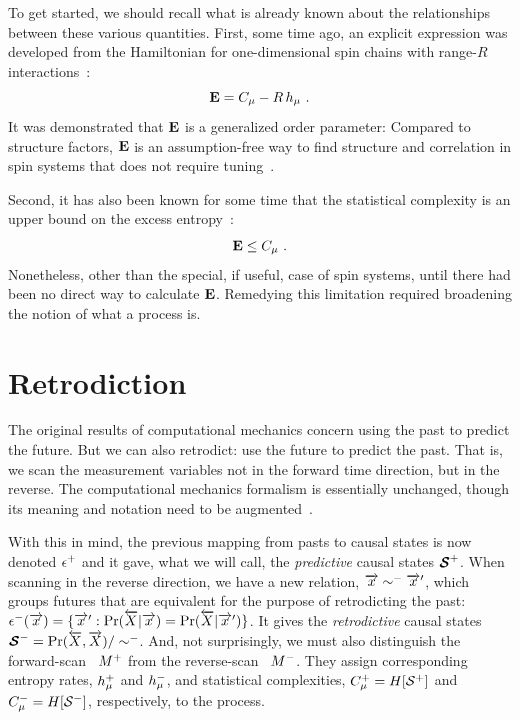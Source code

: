 To get started, we should recall what is already known about the relationships
between these various quantities.
First, some time ago, an explicit expression was developed from the Hamiltonian
for one-dimensional spin chains with range-$R$ interactions~\cite{Crut97a}:
\begin{equation}
{\bf E} = C_\mu - R \, h_\mu ~.
\label{SpinEEandCmu}
\end{equation}
It was demonstrated that ${\bf E}$ is a generalized order parameter: Compared to
structure factors, ${\bf E}$ is an assumption-free way to find structure and
correlation in spin systems that does not require tuning~\cite{Feld98b}.

Second, it has also been known for some time that the statistical complexity
is an upper bound on the excess entropy~\cite{Shal98a}:
\begin{equation}
{\bf E} \leq C_\mu ~.
\label{CmuEBound}
\end{equation}
Nonetheless, other than the special, if useful, case of spin systems, until
 there had been no direct way to calculate ${\bf E}$. Remedying
this limitation required broadening the notion of what a process is.

\section{Retrodiction}

The original results of computational mechanics concern using the past to
predict the future. But we can also retrodict: use the future to predict
the past. That is, we scan the measurement variables not in the forward time
direction, but in the reverse. The computational mechanics formalism is
essentially unchanged, though its meaning and notation need to be 
augmented~\cite{Crut91b}.

With this in mind, the previous mapping from pasts to causal states is
now denoted $\epsilon^{+}$ and it gave, what we will call, the
\emph{predictive} causal states
${\boldsymbol{\mathcal{S}}}^{+}$. When scanning in the reverse direction, we
have a new relation, $\overrightarrow{{x}} \sim^{-} \overrightarrow{{x}}^\prime$, which groups futures
that are equivalent for the purpose of retrodicting the past:
$\epsilon^{-}(\overrightarrow{{x}}) =
  \{ \overrightarrow{{x}}^\prime: \Pr(\overleftarrow {{X}}|\overrightarrow{{x}}) = \Pr(\overleftarrow {{X}}|\overrightarrow{{x}}^\prime) \}$.
It gives the \emph{retrodictive} causal states
${\boldsymbol{\mathcal{S}}}^{-} = \Pr(\overleftarrow {{X}},\overrightarrow{{X}}) / \sim^{-}$.
And, not surprisingly, we must also distinguish the forward-scan
\eM\ ${M}^{+}$ from the reverse-scan \eM\ ${M}^{-}$. They assign
corresponding entropy rates, $h_\mu^{+}$ and $h_\mu^{-}$, and
statistical complexities, $C_\mu^{+} = H[{\mathcal{S}}^{+}]$
and $C_\mu^{-} = H[{\mathcal{S}}^{-}]$,
respectively, to the process.

